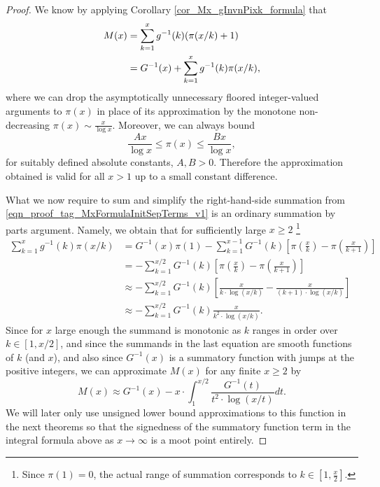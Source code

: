 \documentclass[11pt,reqno,a4letter]{article}
\numberwithin{figure}{section}
\numberwithin{table}{section}
\theoremstyle{plain}
\numberwithin{theorem}{section}
\theoremstyle{definition}
\begin{document}
\begin{proof} 
We know by applying Corollary \ref{cor_Mx_gInvnPixk_formula} that 
\begin{align} 
\notag
M(x) & = \sum_{k=1}^{x} g^{-1}(k) (\pi(x/k)+1) \\ 
\label{eqn_proof_tag_MxFormulaInitSepTerms_v1} 
     & = G^{-1}(x) + \sum_{k=1}^{x} g^{-1}(k) \pi(x/k), 
\end{align} 
where we can drop the asymptotically unnecessary floored integer-valued arguments to $\pi(x)$ in place of 
its approximation by the monotone non-decreasing $\pi(x) \sim \frac{x}{\log x}$. 
Moreover, we can always 
bound $$\frac{Ax}{\log x} \leq \pi(x) \leq \frac{Bx}{\log x},$$ for suitably defined 
absolute constants, $A,B > 0$. 
Therefore the approximation obtained is valid for all $x > 1$ up to a small constant difference. 

What we now require to sum and simplify the right-hand-side summation from 
\eqref{eqn_proof_tag_MxFormulaInitSepTerms_v1} is an ordinary summation by parts argument. 
Namely, we obtain that for sufficiently large 
$x \geq 2$ \footnote{
     Since $\pi(1) = 0$, the actual range of summation corresponds to 
     $k \in \left[1, \frac{x}{2}\right]$. 
}
\begin{align*} 
\sum_{k=1}^{x} g^{-1}(k) \pi(x/k) & = G^{-1}(x) \pi(1) - \sum_{k=1}^{x-1} G^{-1}(k) \left[ 
     \pi\left(\frac{x}{k}\right) - \pi\left(\frac{x}{k+1}\right)\right] \\ 
     & = -\sum_{k=1}^{x/2} G^{-1}(k) \left[ 
     \pi\left(\frac{x}{k}\right) - \pi\left(\frac{x}{k+1}\right)\right] \\ 
     & \approx -\sum_{k=1}^{x/2} G^{-1}(k) \left[ 
     \frac{x}{k \cdot \log(x/k)} - \frac{x}{(k+1) \cdot \log(x/k)}\right] \\ 
     & \approx -\sum_{k=1}^{x/2} G^{-1}(k) \frac{x}{k^2 \cdot \log(x/k)}. 
\end{align*} 
Since for $x$ large enough the summand is monotonic as $k$ ranges in order over $k \in [1, x/2]$, and 
since the summands in the last equation are smooth functions of $k$ (and $x$), and also since $G^{-1}(x)$ is 
a summatory function with jumps at the positive integers, we can approximate 
$M(x)$ for any finite $x \geq 2$ by 
\[
M(x) \approx G^{-1}(x) - x \cdot \int_1^{x/2} \frac{G^{-1}(t)}{t^2 \cdot \log(x/t)} dt. 
\]
We will later only use unsigned lower bound approximations to this function in the next theorems so that 
the signedness of the summatory function term in the integral formula above 
as $x \rightarrow \infty$ is a moot point entirely. 
\end{proof} 
\end{document}
